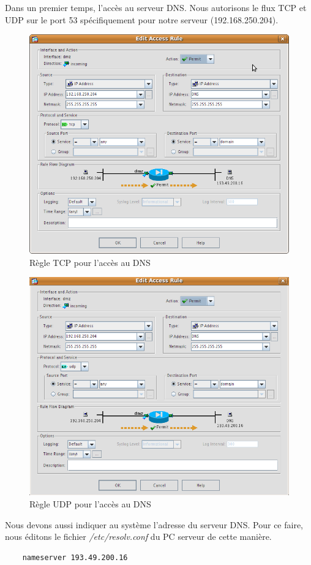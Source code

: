 \documentclass[a4paper,12pt]{article}
\begin{document}
Dans un premier temps, l'accès au serveur DNS. Nous autorisons le flux TCP et UDP sur le port 53 spécifiquement pour notre serveur (192.168.250.204).
\begin{figure}[H]
	\center
	\includegraphics[width=12cm]{img/12-policydmzdnstcp.png}
	\caption{Règle TCP pour l'accès au DNS}
\end{figure}
\begin{figure}[H]
	\center
	\includegraphics[width=12cm]{img/12-policydmzdnsudp.png}
	\caption{Règle UDP pour l'accès au DNS}
\end{figure}

Nous devons aussi indiquer au système l'adresse du serveur DNS. Pour ce faire, nous éditons le fichier \textit{/etc/resolv.conf} du PC serveur de cette manière.
\begin{lstlisting}
	nameserver 193.49.200.16
\end{lstlisting}
\end{document}
